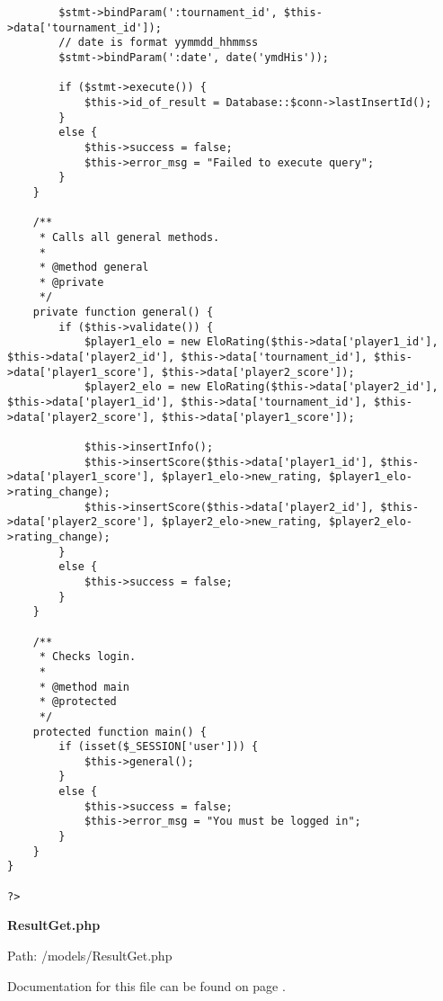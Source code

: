 {\begin{lstlisting}
		$stmt->bindParam(':tournament_id', $this->data['tournament_id']);
		// date is format yymmdd_hhmmss
		$stmt->bindParam(':date', date('ymdHis'));

		if ($stmt->execute()) {
			$this->id_of_result = Database::$conn->lastInsertId();
		}
		else {
			$this->success = false;
			$this->error_msg = "Failed to execute query";
		}
	}

	/**
	 * Calls all general methods.
	 *
	 * @method general
	 * @private
	 */
	private function general() {
		if ($this->validate()) {
			$player1_elo = new EloRating($this->data['player1_id'], $this->data['player2_id'], $this->data['tournament_id'], $this->data['player1_score'], $this->data['player2_score']);
			$player2_elo = new EloRating($this->data['player2_id'], $this->data['player1_id'], $this->data['tournament_id'], $this->data['player2_score'], $this->data['player1_score']);

			$this->insertInfo();
			$this->insertScore($this->data['player1_id'], $this->data['player1_score'], $player1_elo->new_rating, $player1_elo->rating_change);
			$this->insertScore($this->data['player2_id'], $this->data['player2_score'], $player2_elo->new_rating, $player2_elo->rating_change);
		}
		else {
			$this->success = false;
		}
	}

	/**
	 * Checks login.
	 *
	 * @method main
	 * @protected
	 */
	protected function main() {
		if (isset($_SESSION['user'])) {
			$this->general();
		}
		else {
			$this->success = false;
			$this->error_msg = "You must be logged in";
		}
	}
}

?>\end{lstlisting}
}
\textbf{ResultGet.php}\label{ResultGet.php}

Path: /models/ResultGet.php

Documentation for this file can be found on page \pageref{ResultGet.php.doc}.

